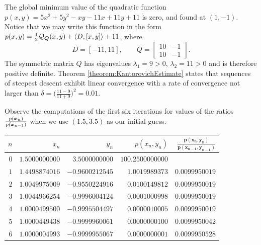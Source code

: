 \begin{example}\label{example:SDconvergenceRate}
The global minimum value of the quadratic function $p(x,y) = 5x^2 + 5y^2 -xy -11x +11y +11$ is zero, and found at $(1,-1)$.  Notice that we may write this function in the form $p(x,y) = \tfrac{1}{2}\mathcal{Q}_{\boldsymbol{Q}}(x,y) + \langle D, [x,y] \rangle + 11$, where
\begin{equation*}
D = [ -11, 11], \qquad Q = \begin{bmatrix} 10 & -1 \\ 10 & -1 \end{bmatrix}.
\end{equation*}
The symmetric matrix $Q$ has eigenvalues $\lambda_1 = 9 >0$, $\lambda_2 = 11 > 0$ and is therefore positive definite.  Theorem \ref{theorem:KantorovichEstimate} states that sequences of steepest descent exhibit linear convergence with a rate of convergence not larger than $\delta = \big( \tfrac{11-9}{11+9} \big)^2 = 0.01$.

Observe the computations of the first six iterations for values of the ratios $\frac{p(\boldsymbol{x}_n)}{p(\boldsymbol{x}_{n-1})}$ when we use $(1.5,3.5)$ as our initial guess.
\begin{center}
\begin{tabular}{|r|r|r|r|r|} \hline 
 $n$ & $x_n$ & $y_n$ & $p(x_n,y_n)$ & $\boldsymbol{\frac{p(x_n,y_n)}{p(x_{n-1},y_{n-1})}}$ \\ \hline \hline 
$0$ & $1.5000000000$ & $3.5000000000$ & $100.2500000000$ &  \\ \hline 
$1$ & $1.4498874016$ & $-0.9600212545$ & $1.0019989373$ & $\boldsymbol{0.0099950019}$ \\ \hline 
$2$ & $1.0049975009$ & $-0.9550224916$ & $0.0100149812$ & $\boldsymbol{0.0099950019}$ \\ \hline 
$3$ & $1.0044966254$ & $-0.9996004124$ & $0.0001000998$ & $\boldsymbol{0.0099950019}$ \\ \hline 
$4$ & $1.0000499500$ & $-0.9995504497$ & $0.0000010005$ & $\boldsymbol{0.0099950019}$ \\ \hline 
$5$ & $1.0000449438$ & $-0.9999960061$ & $0.0000000100$ & $\boldsymbol{0.0099950042}$ \\ \hline 
$6$ & $1.0000004993$ & $-0.9999955067$ & $0.0000000001$ & $\boldsymbol{0.0099950528}$ \\ \hline 
\end{tabular}
\end{center}
\end{example}

